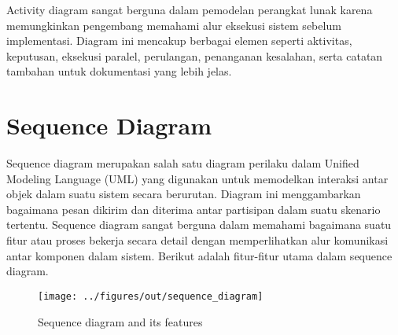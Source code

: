 Activity diagram sangat berguna dalam pemodelan perangkat lunak karena memungkinkan pengembang memahami alur eksekusi sistem sebelum implementasi. Diagram ini mencakup berbagai elemen seperti aktivitas, keputusan, eksekusi paralel, perulangan, penanganan kesalahan, serta catatan tambahan untuk dokumentasi yang lebih jelas.


\section{Sequence Diagram}

Sequence diagram merupakan salah satu diagram perilaku dalam Unified Modeling Language (UML) yang digunakan untuk memodelkan interaksi antar objek dalam suatu sistem secara berurutan. Diagram ini menggambarkan bagaimana pesan dikirim dan diterima antar partisipan dalam suatu skenario tertentu. Sequence diagram sangat berguna dalam memahami bagaimana suatu fitur atau proses bekerja secara detail dengan memperlihatkan alur komunikasi antar komponen dalam sistem. Berikut adalah fitur-fitur utama dalam sequence diagram.

\begin{figure}[ht]
	\centering
	\texttt{[image: ../figures/out/sequence\_diagram]}
	\caption{Sequence diagram and its features}
	\label{fig:sequence_diagram}
\end{figure}


